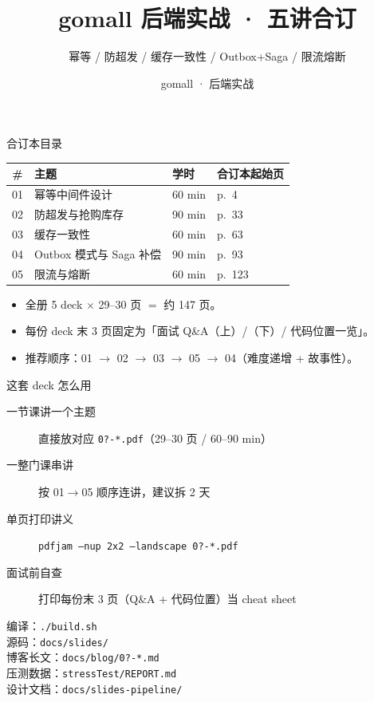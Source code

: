 

\title{gomall 后端实战 · 五讲合订}
\subtitle{幂等 / 防超发 / 缓存一致性 / Outbox+Saga / 限流熔断}
\author{gomall · 后端实战}
\date{}



\maketitle

\begin{frame}{合订本目录}
\begin{tabular}{@{}clll@{}}
\toprule
\# & 主题 & 学时 & 合订本起始页 \\
\midrule
01 & 幂等中间件设计                       & 60 min & p.~4   \\
02 & 防超发与抢购库存                     & 90 min & p.~33  \\
03 & 缓存一致性                           & 60 min & p.~63  \\
04 & Outbox 模式与 Saga 补偿              & 90 min & p.~93  \\
05 & 限流与熔断                           & 60 min & p.~123 \\
\bottomrule
\end{tabular}

\vspace{4mm}
\small
\begin{itemize}
  \item 全册 5 deck $\times$ 29--30 页 $=$ 约 147 页。
  \item 每份 deck 末 3 页固定为「面试 Q\&A（上）/（下）/ 代码位置一览」。
  \item 推荐顺序：01 $\to$ 02 $\to$ 03 $\to$ 05 $\to$ 04（难度递增 + 故事性）。
\end{itemize}

\end{frame}

\begin{frame}{这套 deck 怎么用}
\begin{description}
  \item[一节课讲一个主题] 直接放对应 \texttt{0?-*.pdf}（29--30 页 / 60--90 min）
  \item[一整门课串讲]     按 01$\to$05 顺序连讲，建议拆 2 天
  \item[单页打印讲义]     \texttt{pdfjam --nup 2x2 --landscape 0?-*.pdf}
  \item[面试前自查]       打印每份末 3 页（Q\&A + 代码位置）当 cheat sheet
\end{description}

\vspace{3mm}
\small 编译：\texttt{./build.sh}\\
源码：\texttt{docs/slides/}\\
博客长文：\texttt{docs/blog/0?-*.md}\\
压测数据：\texttt{stressTest/REPORT.md}\\
设计文档：\texttt{docs/slides-pipeline/}
\end{frame}


